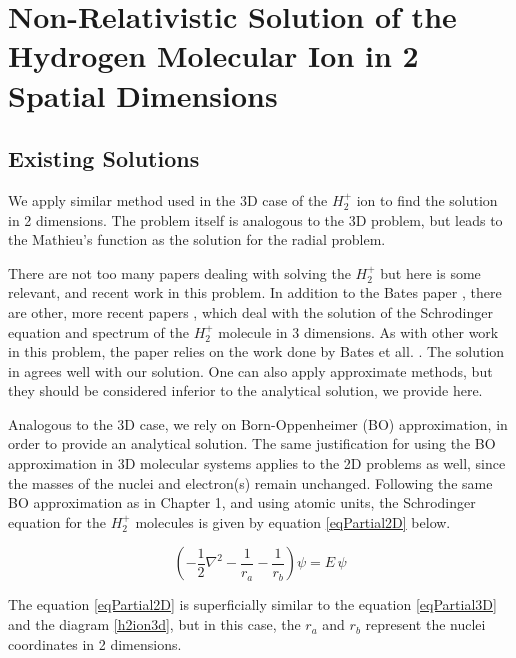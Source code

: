 \chapter{Non-Relativistic Solution of the Hydrogen Molecular Ion in 2 Spatial Dimensions}

\section{Existing Solutions}

We apply similar method used in the 3D case of the $ H_2^{+} $ ion to find the solution in 2 dimensions. The problem itself is analogous to the 3D problem, but leads to the Mathieu's function as the solution for the radial problem.

There are not too many papers dealing with solving the $ H_2^{+} $ but here is some relevant, and recent work in this problem. In addition to the Bates paper \cite{Bates1}, there are other, more recent papers \cite{H2Plus2d1} \cite{TwoCentersParticle}, \cite{Kolos} which deal with the solution of the Schrodinger equation and spectrum of the $ H_2^{+} $ molecule in 3 dimensions.  As with other work in this problem, the paper relies on the work done by Bates et all. \cite{Bates1}. The solution in \cite{H2Plus2d1} agrees well with our solution.  One can also apply approximate methods, but they should be considered inferior to the analytical solution, we provide here. 

Analogous to the 3D case, we rely on Born-Oppenheimer (BO) approximation, in order to provide an analytical solution. The same justification for using the BO approximation in 3D molecular systems applies to the 2D problems as well, since the masses of the nuclei and electron(s) remain unchanged.  Following the same BO approximation as in Chapter 1, and using atomic units, the Schrodinger equation for the $ H_2^{+} $ molecules is given by equation \eqref{eqPartial2D} below. 


\begin{equation}\label{eqPartial2D}
\left(-\frac{1}{2}\nabla^2-\frac{1}{r_a}-\frac{1}{r_b}\right)\psi = E\,\psi
\end{equation}

The equation \eqref{eqPartial2D} is superficially similar to the equation \eqref{eqPartial3D} and the diagram \ref{h2ion3d}, but in this case, the $ r_a $ and $ r_b $ represent the nuclei coordinates in 2 dimensions.

